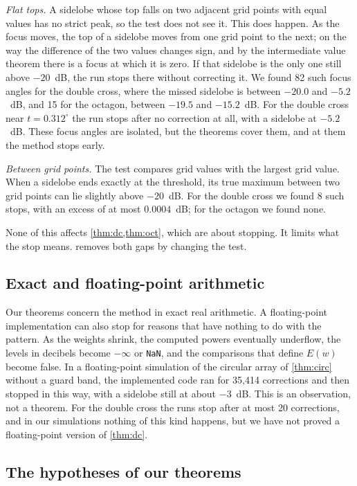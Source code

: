 \documentclass[11pt]{amsart}
\theoremstyle{plain}
\theoremstyle{definition}
\newcommand{\El}{E}
\begin{document}
\emph{Flat tops.}  A sidelobe whose top falls on two adjacent grid points with equal values has no
strict peak, so the test does not see it.  This does happen.  As the focus moves, the top of a
sidelobe moves from one grid point to the next; on the way the difference of the two values changes
sign, and by the intermediate value theorem there is a focus at which it is zero.  If that sidelobe
is the only one still above $-20$~dB, the run stops there without correcting it.  We found 82 such
focus angles for the double cross, where the missed sidelobe is between $-20.0$ and $-5.2$~dB, and 15
for the octagon, between $-19.5$ and $-15.2$~dB.  For the double cross near $t = 0.312^\circ$ the run
stops after no correction at all, with a sidelobe at $-5.2$~dB.  These focus angles are isolated, but
the theorems cover them, and at them the method stops early.

\emph{Between grid points.}  The test compares grid values with the largest grid value.  When a
sidelobe ends exactly at the threshold, its true maximum between two grid points can lie slightly
above $-20$~dB.  For the double cross we found 8 such stops, with an excess of at most $0.0004$~dB;
for the octagon we found none.

None of this affects \cref{thm:dc,thm:oct}, which are about stopping.  It limits what the stop
means.   removes both gaps by changing the test.

\subsection{Exact and floating-point arithmetic}\label{sec:fp}

Our theorems concern the method in exact real arithmetic.  A floating-point implementation can also
stop for reasons that have nothing to do with the pattern.  As the weights shrink, the computed
powers eventually underflow, the levels in decibels become $-\infty$ or \texttt{NaN}, and the
comparisons that define $\El(w)$ become false.  In a floating-point simulation of the circular array
of \cref{thm:circ} without a guard band, the implemented code ran for 35{,}414 corrections and then
stopped in this way, with a sidelobe still at about $-3$~dB.  This is an observation, not a theorem.
For the double cross the runs stop after at most 20 corrections, and in our simulations nothing of
this kind happens, but we have not proved a floating-point version of \cref{thm:dc}.

\subsection{The hypotheses of our theorems}
\end{document}
